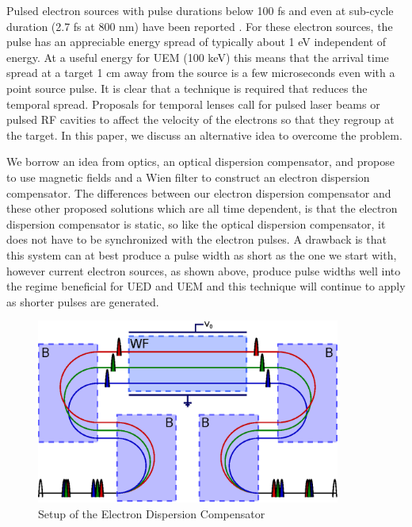 \documentclass[12pt,letterpaper]{article}
\begin{document}
Pulsed electron sources with pulse durations below 100 fs \cite{Bat} and even at sub-cycle duration (2.7 fs at 800 nm) have been reported \cite{Kasevich,Hommelhof}.  For these electron sources, the pulse has an appreciable energy spread of typically about 1 eV independent of energy. At a useful energy for UEM (100 keV) this means that the arrival time spread at a target 1 cm away from the source is a few microseconds even with a point source pulse. It is clear that a technique is required that reduces the temporal spread. Proposals for temporal lenses call for pulsed laser beams \cite{PNAS} or pulsed RF cavities \cite{Kraus} to affect the velocity of the electrons so that they regroup at the target. In this paper, we discuss an alternative idea to overcome the problem.

We borrow an idea from optics, an optical dispersion compensator, and propose to use magnetic fields and a Wien filter to construct an  electron dispersion compensator. The differences between our electron dispersion compensator and these other proposed solutions which are all time dependent, is that the electron dispersion compensator is static, so like the optical dispersion compensator, it does not have to be synchronized with the electron pulses. A drawback is that this system can at best produce a pulse width as short as the one we start with, however current electron sources, as shown above, produce pulse widths well into the regime beneficial for UED and UEM and this technique will continue to apply as shorter pulses are generated.

\begin{figure}[bt]
   \centering
   \includegraphics[width=10cm]{Setup.eps}
   \caption{Setup of the Electron Dispersion Compensator}
   
   \label{setup_e}
\end{figure}
\end{document}
